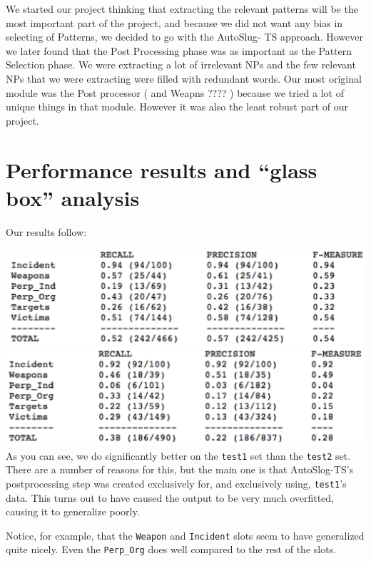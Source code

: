 \documentclass[11pt]{myclass}
\begin{document}
We started our project thinking that extracting the relevant patterns will be the most important part of the project, and because we did not want any bias in selecting of Patterns, we decided to go with the AutoSlug- TS approach. However we later found that the Post Processing phase was as important as the Pattern Selection phase. We were extracting a lot of irrelevant NPs and the few relevant NPs that we were extracting were filled with redundant words. Our most original module was the Post processor ( and Weapns ???? ) because we tried a lot of unique things in that module. However it was also the least robust part of our project.

\section{Performance results and “glass box” analysis}

Our results follow:

\includegraphics[scale=0.75]{result_t1.png} \\
\includegraphics[scale=0.75]{result_t2.png} \\

As you can see, we do significantly better on the \texttt{test1} set than the \texttt{test2} set. There are a number of reasons for this, but the main one is that AutoSlog-TS's postprocessing step was created exclusively for, and exclusively using, \texttt{test1}'s data. This turns out to have caused the output to be very much overfitted, causing it to generalize poorly.

Notice, for example, that the \texttt{Weapon} and \texttt{Incident} slots seem to have generalized quite nicely. Even the \texttt{Perp\_Org} does well compared to the rest of the slots.
\end{document}
